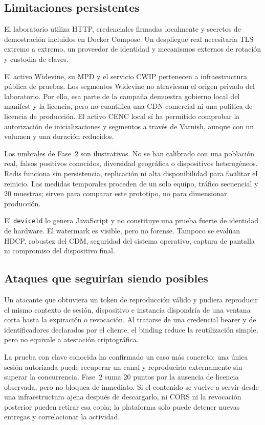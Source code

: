 \subsection{Limitaciones persistentes}

El laboratorio utiliza HTTP, credenciales firmadas localmente y secretos de demostración incluidos en Docker Compose. Un despliegue real necesitaría TLS extremo a extremo, un proveedor de identidad y mecanismos externos de rotación y custodia de claves.

El activo Widevine, su MPD y el servicio CWIP pertenecen a infraestructura pública de pruebas. Los segmentos Widevine no atraviesan el origen privado del laboratorio. Por ello, esa parte de la campaña demuestra gobierno local del manifest y la licencia, pero no cuantifica una CDN comercial ni una política de licencia de producción. El activo CENC local sí ha permitido comprobar la autorización de inicializaciones y segmentos a través de Varnish, aunque con un volumen y una duración reducidos.

Los umbrales de Fase~2 son ilustrativos. No se han calibrado con una población real, falsos positivos conocidos, diversidad geográfica o dispositivos heterogéneos. Redis funciona sin persistencia, replicación ni alta disponibilidad para facilitar el reinicio. Las medidas temporales proceden de un solo equipo, tráfico secuencial y 20 muestras; sirven para comparar este prototipo, no para dimensionar producción.

El \nolinkurl{deviceId} lo genera JavaScript y no constituye una prueba fuerte de identidad de hardware. El watermark es visible, pero no forense. Tampoco se evalúan HDCP, robustez del CDM, seguridad del sistema operativo, captura de pantalla ni compromiso del dispositivo final.

\subsection{Ataques que seguirían siendo posibles}

Un atacante que obtuviera un token de reproducción válido y pudiera reproducir el mismo contexto de sesión, dispositivo e instancia dispondría de una ventana corta hasta la expiración o revocación. Al tratarse de una credencial bearer y de identificadores declarados por el cliente, el binding reduce la reutilización simple, pero no equivale a atestación criptográfica.

La prueba con clave conocida ha confirmado un caso más concreto: una única sesión autorizada puede recuperar un canal y reproducirlo externamente sin superar la concurrencia. Fase~2 suma 20 puntos por la ausencia de licencia observada, pero no bloquea de inmediato. Si el contenido se vuelve a servir desde una infraestructura ajena después de descargarlo, ni CORS ni la revocación posterior pueden retirar esa copia; la plataforma solo puede detener nuevas entregas y correlacionar la actividad.

